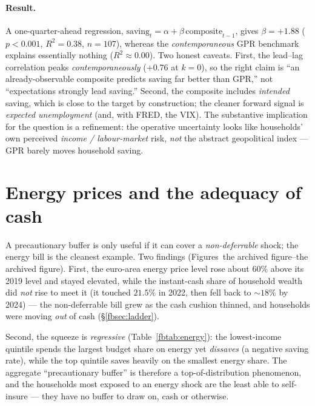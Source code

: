 \documentclass[11pt,a4paper]{article}
\begin{document}
\paragraph{Result.} A one-quarter-ahead regression,
$\text{saving}_t = \alpha + \beta\,\text{composite}_{t-1}$, gives $\beta=+1.88$
($p<0.001$, $R^2=0.38$, $n=107$), whereas the \emph{contemporaneous} GPR
benchmark explains essentially nothing ($R^2\approx0.00$). Two honest caveats.
First, the lead--lag correlation peaks \emph{contemporaneously} ($+0.76$ at
$k=0$), so the right claim is ``an already-observable composite predicts saving
far better than GPR,'' not ``expectations strongly lead saving.'' Second, the
composite includes \emph{intended} saving, which is close to the target by
construction; the cleaner forward signal is \emph{expected unemployment} (and,
with FRED, the VIX). The substantive implication for the question is a
refinement: the operative uncertainty looks like households' own perceived
\emph{income / labour-market} risk, \emph{not} the abstract geopolitical index
--- GPR barely moves household saving.

\section{Energy prices and the adequacy of cash}\label{fbsec:energy}

A precautionary buffer is only useful if it can cover a \emph{non-deferrable}
shock; the energy bill is the cleanest example. Two findings
(Figures~the archived figure--the archived figure).
First, the euro-area energy price level rose about $60\%$ above its 2019 level
and stayed elevated, while the instant-cash share of household wealth did
\emph{not} rise to meet it (it touched $21.5\%$ in 2022, then fell back to
$\sim18\%$ by 2024) --- the non-deferrable bill grew as the cash cushion thinned,
and households were moving \emph{out} of cash (\S\ref{fbsec:ladder}).



Second, the squeeze is \emph{regressive} (Table~\ref{fbtab:energy}): the
lowest-income quintile spends the largest budget share on energy yet
\emph{dissaves} (a negative saving rate), while the top quintile saves heavily on
the smallest energy share. The aggregate ``precautionary buffer'' is therefore a
top-of-distribution phenomenon, and the households most exposed to an energy
shock are the least able to self-insure --- they have no buffer to draw on, cash
or otherwise.
\end{document}
